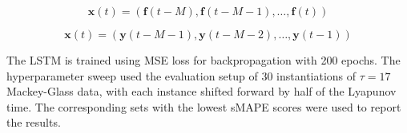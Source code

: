 \begin{equation} \label{eq:lstm_training}
    \mathbf{x}(t) = (\mathbf{f}(t-M), \mathbf{f}(t-M-1), \ldots, \mathbf{f}(t))
\end{equation} 

\begin{equation} \label{eq:lstm_autoregressive}
    \mathbf{x}(t) = (\mathbf{y}(t-M-1), \mathbf{y}(t-M-2), \ldots, \mathbf{y}(t-1))
\end{equation} 


The LSTM is trained using MSE loss for backpropagation with 200 epochs. 
The hyperparameter sweep used the evaluation setup of 30 instantiations of $\tau = 17$ Mackey-Glass data, with each instance shifted forward by half of the Lyapunov time. The corresponding sets with the lowest sMAPE scores were used to report the results.



